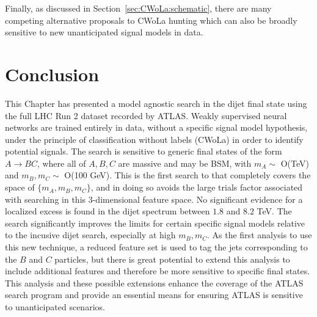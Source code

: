 Finally, as discussed in Section~\ref{sec:CWoLa:schematic}, there are many competing alternative proposals to CWoLa hunting which can also be broadly sensitive to new unanticipated signal models in data.

\section{Conclusion}
\label{sec:CWoLa:conclusion}
This Chapter has presented a model agnostic search in the dijet final state using the full LHC Run 2 dataset recorded by ATLAS.
Weakly supervised neural networks are trained entirely in data, without a specific signal model hypothesis, under the principle of classification without labels (CWoLa) in order to identify potential signals.
The search is sensitive to generic final states of the form $A\rightarrow BC$, where all of $A,B,C$ are massive and may be BSM, with $m_A\sim$ O(TeV) and $m_B,m_C\sim$ O(100 GeV).
This is the first search to that completely covers the space of $\{m_A,m_B,m_C\}$, and in doing so avoids the large trials factor associated with searching in this 3-dimensional feature space.
No significant evidence for a localized excess is found in the dijet spectrum between $1.8$ and $8.2$ TeV.
The search significantly improves the limits for certain specific signal models relative to the incusive dijet search, especially at high $m_B,m_C$.
As the first analysis to use this new technique, a reduced feature set is used to tag the jets corresponding to the $B$ and $C$ particles, but there is great potential to extend this analysis to include additional features and therefore be more sensitive to specific final states.
This analysis and these possible extensions enhance the coverage of the ATLAS search program and provide an essential means for ensuring ATLAS is sensitive to unanticipated scenarios.
